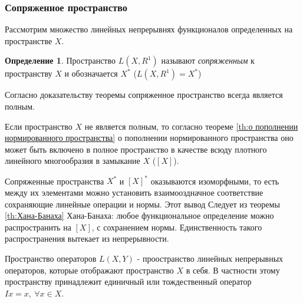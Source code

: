 \documentclass[14pt,a4paper]{extarticle}
\theoremstyle{definition}
\newtheorem{definition}{Определение}[section]
\theoremstyle{remark}
\renewcommand{\[}{\begin{dmath*}[compact]}
\renewcommand{\]}{\end{dmath*}}
\newcommand{\sep}{ , \ \allowbreak }
\begin{document}
\subsubsection{Сопряженное пространство}

Рассмотрим множество линейных непрерывнях функционалов определенных на
пространстве $X$.

\begin{definition}
  Пространство $L(X,R^1)$ называют \textit{сопряженным} к пространству $X$ и
  обозначается $X^*$ ($L(X,R^1)=X^*$)
\end{definition}

Согласно доказательству теоремы сопряженное пространство всегда является полным.

Если пространство $X$ не является полным, то согласно теореме
\ref{th:о пополнении нормированного пространства}
о пополнении нормированного пространства оно может быть включено в полное
пространство в качестве всюду плотного линейного многообразия в замыкание $X$
($[X]$).

Сопряженные пространства $X^*$ и $[X]^*$ оказываются изоморфными, то есть между
их элементами можно установить взаимооздначное соответствие сохраняющие
линейные операции и нормы. Этот вывод Следует из теоремы \ref{th:Хана-Банаха}
Хана-Банаха: любое функциональное определение можно распространить на $[X]$,
с сохранением нормы.
Единственность такого распространения вытекает из непрерывности.

Пространство операторов $L(X,Y)$ - проостранство линейных непрерывных
операторов, которые отображают пространство $X$ в себя. В частности этому
пространству принадлежит единичный или тождественный оператор
$Ix=x \sep \forall x \in X$.

\end{document}
